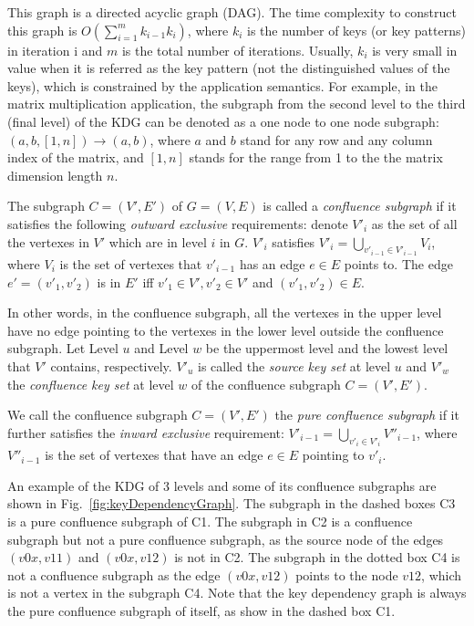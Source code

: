 \documentclass[10pt,journal,compsoc]{IEEEtran}
\begin{document}
This graph is a directed acyclic graph (DAG).
The time complexity to construct this graph is $O(\sum_{i=1}^m k_{i-1} k_i)$, 
where $k_i$ is the number of keys (or key patterns) in iteration i and $m$ is the total number of iterations.
Usually, $k_i$ is very small in value when it is referred as the key pattern (not the distinguished values of the keys), which is constrained by the application semantics. 
For example, in the matrix multiplication application, the subgraph from the second level to the third (final level) of the KDG can be denoted as a one node to one node subgraph: $(a, b, [1, n]) \rightarrow (a, b)$, 
where $a$ and $b$ stand for any row and any column index of the matrix, 
and $[1, n]$ stands for the range from 1 to the the matrix dimension length $n$.

The subgraph $C=(V', E')$ of $G=(V,E)$ is called a \emph{confluence subgraph} if it satisfies the following
\emph{outward exclusive} requirements: 
denote $V'_i$ as the set of all the vertexes in $V'$ which are in level $i$ in $G$.  
$V'_i$ satisfies $V'_i=\bigcup_{v'_{i-1} \in V'_{i-1}}V_i$, where $V_i$ is the set of vertexes that $v'_{i-1}$ has an edge $e \in E$ points to. 
The edge $e' =(v'_1,v'_2)$ is in $E'$ iff $v'_1 \in V', v'_2 \in V'$ and $(v'_1,v'_2) \in E$.

In other words, in the confluence subgraph, all the vertexes in the upper level have no edge pointing to
the vertexes in the lower level outside the confluence subgraph. 
Let Level $u$ and Level $w$ be the uppermost level and the lowest level that $V'$ contains, respectively. 
$V'_u$ is called the \emph{source key set} at level $u$ and $V'_w$ the \emph{confluence key set} at level $w$
of the confluence subgraph $C=(V',E')$. 

We call the confluence subgraph $C=(V', E')$ the \emph{pure confluence subgraph} if 
it further satisfies the \emph{inward exclusive} requirement: 
$V'_{i-1}=\bigcup_{v'_i \in V'_i}V''_{i-1}$, where $V''_{i-1}$ is the set of vertexes that have an edge $e \in E$ pointing to $v'_i$. 


An example of the KDG of 3 levels and some of its confluence subgraphs are shown in Fig.~\ref{fig:keyDependencyGraph}. The subgraph in the dashed boxes C3 is a pure confluence subgraph 
of C1. The subgraph in C2 is a confluence subgraph but not a pure confluence subgraph, 
as the source node of the edges $(v0x, v11)$ and $(v0x, v12)$ is not in C2. 
The subgraph in the dotted box C4 is not a confluence subgraph as the edge $(v0x, v12)$ 
points to the node $v12$, which is not a vertex in the subgraph C4. 
Note that the key dependency graph is always the pure confluence subgraph of itself, as show in the dashed box C1. 
\end{document}
